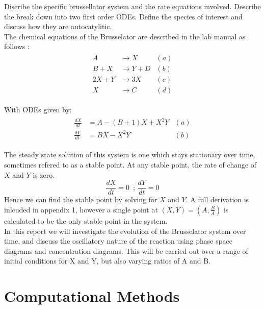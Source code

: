 \documentclass[reprint, amsmath, amssymb, aps]{revtex4-2}
\begin{document}
Discribe the specific brussellator system and the rate equations involved. Describe the break down into two first order ODEs. Define the species of interest and discuss how they are autocatylitic.\\

The chemical equations of the Brusselator are described in the lab manual as follows \cite{manual}:
\begin{align}
	\begin{aligned}
	A &\rightarrow X & (a)\\
	B + X &\rightarrow Y + D & (b)\\
	2X + Y &\rightarrow 3X & (c)\\
	X &\rightarrow C & (d)
	\end{aligned}
\end{align}

With ODEs given by:
\begin{align}
	\begin{aligned}
	\frac{dX}{dt} &= A - (B + 1)X + X^2 Y & (a)\\
	\frac{dY}{dt} &= BX - X^2 Y & (b)
	\end{aligned}
\end{align}

The steady state solution of this system is one which stays stationary over time, sometimes refered to as a stable point. At any stable point, the rate of change of $X$ and $Y$ is zero.
\begin{equation}
	\frac{dX}{dt}=0\,\text{  ;  }\frac{dY}{dt}=0
\end{equation}Hence we can find the stable point by solving for $X$ and $Y$. A full derivation is inlcuded in appendix 1, however a single point at $(X, Y) = \left(A, \frac{B}{A}\right)$ is calculated to be the only stable point in the system.\\

In this report we will investigate the evolution of the Brusselator system over time, and discuss the oscillatory nature of the reaction using phase space diagrams and concentration diagrams. This will be carried out over a range of initial conditions for X and Y, but also varying ratios of A and B.

\section{Computational Methods}
\end{document}
